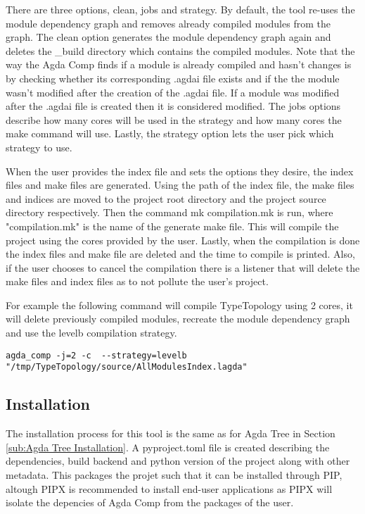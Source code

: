 There are three options, clean, jobs and strategy. By default, the tool re-uses
the module dependency graph and removes already compiled modules from the
graph. The clean option generates the module dependency graph again and deletes
the _build directory which contains the compiled modules. Note that the way the
Agda Comp finds if a module is already compiled and hasn't changes is by
checking whether its corresponding .agdai file exists and if the the module
wasn't modified after the creation of the .agdai file. If a module was modified
after the .agdai file is created then it is considered modified. The jobs
options describe how many cores will be used in the strategy and how many cores
the make command will use. Lastly, the strategy option lets the user pick which
strategy to use.

When the user provides the index file and sets the options they desire, the
index files and make files are generated. Using the path of the index file, the
make files and indices are moved to the project root directory and the project
source directory respectively. Then the command \textsf{mk compilation.mk} is
run, where "compilation.mk" is the name of the generate make file. This will
compile the project using the cores provided by the user. Lastly, when the
compilation is done the index files and make file are deleted and the time to
compile is printed. Also, if the user chooses to cancel the compilation there
is a listener that will delete the make files and index files as to not pollute
the user's project.

For example the following command will compile TypeTopology using 2 cores, it
will delete previously compiled modules, recreate the module dependency graph
and use the levelb compilation strategy.

\begin{lstlisting}
agda_comp -j=2 -c  --strategy=levelb "/tmp/TypeTopology/source/AllModulesIndex.lagda"
\end{lstlisting}


\subsection{Installation}

The installation process for this tool is the same as for Agda Tree in Section
\ref{sub:Agda Tree Installation}. A pyproject.toml file is created describing
the dependencies, build backend and python version of the project along with
other metadata. This packages the projet such that it can be installed through
PIP, altough PIPX is recommended to install end-user applications as PIPX will
isolate the depencies of Agda Comp from the packages of the user.

